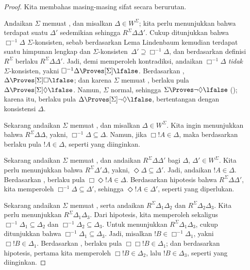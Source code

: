 \documentclass[../../../include/open-logic-section]{subfiles}
\begin{document}
\begin{proof}
  Kita membahas masing-masing sifat secara berurutan.

  Andaikan $\Sigma$ memuat , dan misalkan $\Delta \in W^\Sigma$; kita
  perlu menunjukkan bahwa terdapat suatu $\Delta'$ sedemikian sehingga
  $R^\Sigma \Delta\Delta'$. Cukup ditunjukkan bahwa $\Box^{-1}\Delta$
  $\Sigma$-konsisten, sebab berdasarkan Lema Lindenbaum kemudian terdapat
  suatu himpunan lengkap dan $\Sigma$-konsisten~$\Delta' \supseteq
  \Box^{-1}\Delta$, dan berdasarkan definisi $R^\Sigma$
  berlaku
  $R^\Sigma \Delta\Delta'$. Jadi, demi memperoleh kontradiksi, andaikan
  $\Box^{-1}\Delta$ \emph{tidak} $\Sigma$-konsisten, yakni
  $\Box^{-1}\Delta \Proves[\Sigma] \lfalse$. Berdasarkan
  , $\Delta \Proves[\Sigma] \Box\lfalse$; dan karena
  $\Sigma$ memuat , berlaku pula
  $\Delta \Proves[\Sigma] \Diamond\lfalse$. Namun, $\Sigma$ normal, sehingga
  $\Sigma \Proves \lnot\Diamond \lfalse$
  (); karena itu, berlaku pula $\Delta
  \Proves[\Sigma] \lnot\Diamond \lfalse$, bertentangan dengan konsistensi
  $\Delta$.

  Sekarang andaikan $\Sigma$ memuat , dan misalkan $\Delta \in
  W^\Sigma$. Kita ingin menunjukkan bahwa $R^\Sigma \Delta\Delta$,
  yakni,
  $\Box^{-1}\Delta \subseteq \Delta$. Namun, jika $\Box!A \in \Delta$,
  maka berdasarkan  berlaku pula $!A \in \Delta$, seperti yang
  diinginkan.

  Sekarang andaikan $\Sigma$ memuat , dan andaikan $R^\Sigma
  \Delta\Delta'$ bagi $\Delta$, $\Delta' \in W^\Sigma$. Kita perlu
  menunjukkan bahwa $R^\Sigma \Delta'\Delta$, yakni,
  $\Diamond\Delta \subseteq \Delta'$. Jadi, andaikan $!A \in \Delta$.
  Berdasarkan , berlaku pula $\Box\Diamond!A \in \Delta$. Berdasarkan
  hipotesis bahwa $R^\Sigma \Delta\Delta'$, kita memperoleh
  $\Box^{-1}\Delta \subseteq \Delta'$, sehingga
  $\Diamond!A \in \Delta'$, seperti yang diperlukan.

  Sekarang andaikan $\Sigma$ memuat , serta andaikan $R^\Sigma
  \Delta_1\Delta_2$ dan $R^\Sigma \Delta_2\Delta_3$. Kita perlu menunjukkan
  $R^\Sigma \Delta_1\Delta_3$. Dari hipotesis, kita memperoleh sekaligus
  $\Box^{-1}\Delta_1 \subseteq \Delta_2$ dan
  $\Box^{-1}\Delta_2 \subseteq \Delta_3$. Untuk menunjukkan
  $R^\Sigma \Delta_1\Delta_3$, cukup ditunjukkan bahwa
  $\Box^{-1}\Delta_1 \subseteq \Delta_3$. Jadi, misalkan $!B \in
  \Box^{-1}\Delta_1$, yakni $\Box!B \in \Delta_1$. Berdasarkan ,
  berlaku pula $\Box\Box!B \in \Delta_1$; dan berdasarkan hipotesis, pertama
  kita memperoleh $\Box!B \in \Delta_2$, lalu $!B \in \Delta_3$, seperti
  yang diinginkan.


\end{proof}
\end{document}
